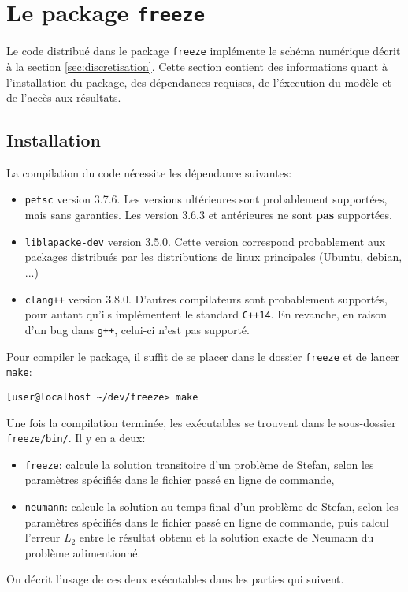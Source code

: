 \section{Le package \texttt{freeze}}
Le code distribu\'e dans le package \texttt{freeze} impl\'emente le
sch\'ema num\'erique d\'ecrit \`a la section
\ref{sec:discretisation}. Cette section contient des informations
quant \`a l'installation du package, des d\'ependances requises, de
l'\'execution du mod\`ele et de l'acc\`es aux r\'esultats.

\subsection{Installation}
La compilation du code n\'ecessite les d\'ependance suivantes:
\begin{itemize}
  \item \texttt{petsc} version 3.7.6. Les versions ult\'erieures sont
    probablement support\'ees, mais sans garanties. Les version 3.6.3
    et ant\'erieures ne sont \textbf{pas} support\'ees.
  \item \texttt{liblapacke-dev} version 3.5.0. Cette version
    correspond probablement aux packages distribu\'es par les
    distributions de linux principales (Ubuntu, debian, ...)
  \item \texttt{clang++} version 3.8.0. D'autres compilateurs sont
    probablement support\'es, pour autant qu'ils impl\'ementent le
    standard \texttt{C++14}. En revanche, en raison d'un bug dans
    \texttt{g++}, celui-ci n'est pas support\'e.
\end{itemize}

Pour compiler le package, il suffit de se placer dans le dossier
\texttt{freeze} et de lancer \texttt{make}:
\begin{lstlisting}[language={},frame=single,basicstyle=\ttfamily\footnotesize]
  [user@localhost ~/dev/freeze> make
\end{lstlisting}
Une fois la compilation termin\'ee, les ex\'ecutables se trouvent dans
le sous-dossier \texttt{freeze/bin/}. Il y en a deux:
\begin{itemize}
\item \texttt{freeze}: calcule la solution transitoire d'un probl\`eme
  de Stefan, selon les param\`etres sp\'ecifi\'es dans le fichier
  pass\'e en ligne de commande,
\item \texttt{neumann}: calcule la solution au temps final d'un probl\`eme
  de Stefan, selon les param\`etres sp\'ecifi\'es dans le fichier
  pass\'e en ligne de commande, puis calcul l'erreur $L_2$ entre le
  r\'esultat obtenu et la solution exacte de Neumann du probl\`eme
  adimentionn\'e.
\end{itemize}
On d\'ecrit l'usage de ces deux ex\'ecutables dans les parties qui suivent.

